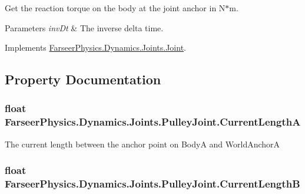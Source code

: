 Get the reaction torque on the body at the joint anchor in N$\ast$m. 


\begin{DoxyParams}{Parameters}
{\em inv\+Dt} & The inverse delta time.\\
\hline
\end{DoxyParams}


Implements \hyperlink{class_farseer_physics_1_1_dynamics_1_1_joints_1_1_joint_a21899d3bdf15c22ef4dc288ed2082cbc}{Farseer\+Physics.\+Dynamics.\+Joints.\+Joint}.



\subsection{Property Documentation}
\hypertarget{class_farseer_physics_1_1_dynamics_1_1_joints_1_1_pulley_joint_a42a77c5661b363600fa0eeb553c1abc9}{
\subsubsection[{Current\+Length\+A}]{\setlength{\rightskip}{0pt plus 5cm}float Farseer\+Physics.\+Dynamics.\+Joints.\+Pulley\+Joint.\+Current\+Length\+A\hspace{0.3cm}{\ttfamily [get]}}}\label{class_farseer_physics_1_1_dynamics_1_1_joints_1_1_pulley_joint_a42a77c5661b363600fa0eeb553c1abc9}


The current length between the anchor point on Body\+A and World\+Anchor\+A 

\hypertarget{class_farseer_physics_1_1_dynamics_1_1_joints_1_1_pulley_joint_ad710876f9f9f55ca5a130d79f75feb33}{
\subsubsection[{Current\+Length\+B}]{\setlength{\rightskip}{0pt plus 5cm}float Farseer\+Physics.\+Dynamics.\+Joints.\+Pulley\+Joint.\+Current\+Length\+B\hspace{0.3cm}{\ttfamily [get]}}}\label{class_farseer_physics_1_1_dynamics_1_1_joints_1_1_pulley_joint_ad710876f9f9f55ca5a130d79f75feb33}


